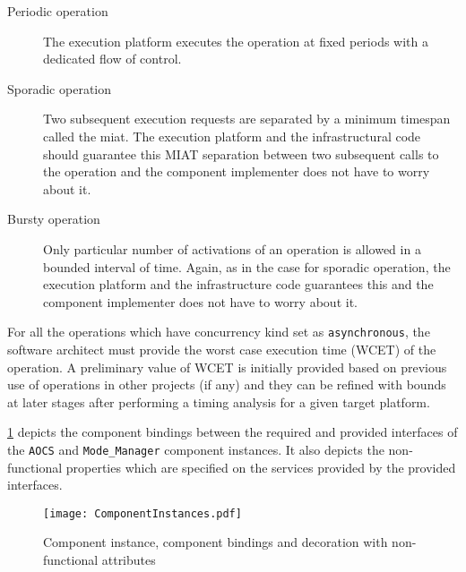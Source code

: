 \begin{description}
\begin{description}
\item [Periodic operation] The execution platform executes the operation at fixed periods with a dedicated flow of control.
\item [Sporadic operation] Two subsequent execution requests are separated by a minimum timespan called the \ac{miat}. The execution platform and the infrastructural code should guarantee this MIAT separation between two subsequent calls to the operation and the component implementer does not have to worry about it.
\item [Bursty operation] Only particular number of activations of an operation is allowed in a bounded interval of time. Again, as in the case for sporadic operation, the execution platform and the infrastructure code guarantees this and the component implementer does not have to worry about it.
\end{description} 

For all the operations which have concurrency kind set as \texttt{asynchronous}, the software architect must provide the worst case execution time (WCET) of the operation. A preliminary value of WCET is initially provided based on previous use of operations in other projects (if any) and they can be refined with bounds at later stages after performing a timing analysis for a given target platform.

\cref{fig: Component instances} depicts the component bindings between the required and provided interfaces of the \texttt{AOCS} and \texttt{Mode\_Manager} component instances. It also depicts the non-functional properties which are specified on the services provided by the provided interfaces.

\begin{figure}[h]
	\centering
	\texttt{[image: ComponentInstances.pdf]}
	\caption{Component instance, component bindings and decoration with non-functional attributes}
	\label{fig: Component instances}
\end{figure}


\end{description}
